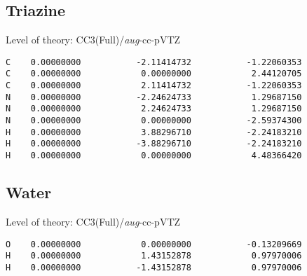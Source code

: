 \documentclass[journal=jctcce,manuscript=article,layout=traditional]{achemso}
\newcommand{\AVTZ}{\emph{aug}-cc-pVTZ}
\begin{document}
\subsection*{Triazine}

\begin{singlespace}
Level of theory: CC3(Full)/{\AVTZ}
\begin{verbatim}
C    0.00000000           -2.11414732           -1.22060353
C    0.00000000            0.00000000            2.44120705
C    0.00000000            2.11414732           -1.22060353
N    0.00000000           -2.24624733            1.29687150
N    0.00000000            2.24624733            1.29687150
N    0.00000000            0.00000000           -2.59374300
H    0.00000000            3.88296710           -2.24183210
H    0.00000000           -3.88296710           -2.24183210
H    0.00000000            0.00000000            4.48366420
\end{verbatim}
\end{singlespace}

\subsection*{Water}

\begin{singlespace}
Level of theory: CC3(Full)/{\AVTZ}
\begin{verbatim}
O    0.00000000            0.00000000           -0.13209669
H    0.00000000            1.43152878            0.97970006
H    0.00000000           -1.43152878            0.97970006
\end{verbatim}
\end{singlespace}
\end{document}
